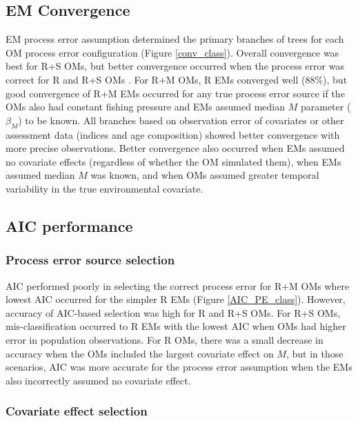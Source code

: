 \documentclass[
  12pt,
]{article}
\begin{document}
\subsection*{EM Convergence}\label{em-convergence-1}

EM process error assumption determined the primary branches of trees for
each OM process error configuration (Figure \ref{conv_class}). Overall
convergence was best for R+S OMs, but better convergence occurred when
the process error was correct for R and R+S OMs . For R+M OMs, R EMs
converged well (88\%), but good convergence of R+M EMs occurred for any
true process error source if the OMs also had constant fishing pressure
and EMs assumed median \(M\) parameter (\(\beta_M\)) to be known. All
branches based on observation error of covariates or other assessment
data (indices and age composition) showed better convergence with more
precise observations. Better convergence also occurred when EMs assumed
no covariate effects (regardless of whether the OM simulated them), when
EMs assumed median \(M\) was known, and when OMs assumed greater
temporal variability in the true environmental covariate.

\subsection*{AIC performance}\label{aic-performance}

\subsubsection*{Process error source
selection}\label{process-error-source-selection}

AIC performed poorly in selecting the correct process error for R+M OMs
where lowest AIC occurred for the simpler R EMs (Figure
\ref{AIC_PE_class}). However, accuracy of AIC-based selection was high
for R and R+S OMs. For R+S OMs, mis-classification occurred to R EMs
with the lowest AIC when OMs had higher error in population
observations. For R OMs, there was a small decrease in accuracy when the
OMs included the largest covariate effect on \(M\), but in those
scenarios, AIC was more accurate for the process error assumption when
the EMs also incorrectly assumed no covariate effect.

\subsubsection*{Covariate effect
selection}\label{covariate-effect-selection}
\end{document}
